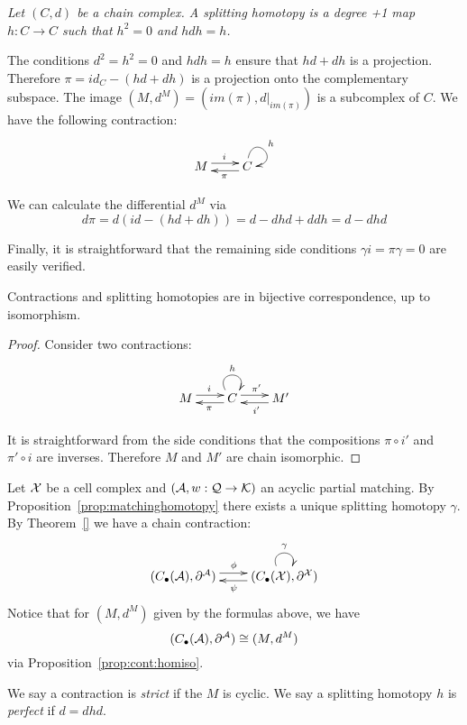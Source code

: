 \begin{defn}
{\em
Let $(C,d)$ be a chain complex.  A {\em splitting homotopy} is a degree +1 map $h:C\to C$ such that $h^2=0$ and $h dh = h$.
}
\end{defn}

The conditions $d^2=h^2=0$ and $hdh = h$ ensure that $hd+dh$ is a projection.  Therefore $\pi=id_C-(hd+dh)$ is a projection onto the complementary subspace.  The image $(M,d^M)=(im(\pi),d|_{im(\pi)})$ is a subcomplex of $C$.  We have the following contraction:
\[
\xymatrixrowsep{0.03in}
\xymatrixcolsep{0.3in}
\xymatrix{
M  \ar[r]<3pt>^{i} & \ar[l]<3pt>^{\pi} C \ar@(u,r)^{h}
}
\]

We can calculate the differential $d^M$ via $$d\pi = d(id-(hd+dh)) = d-dhd + ddh = d-dhd$$

Finally, it is straightforward that the remaining side conditions $\gamma i=\pi\gamma = 0$ are easily verified. 

\begin{prop}\label{prop:cont:homiso}
Contractions and splitting homotopies are in bijective correspondence, up to isomorphism.
\end{prop}
\begin{proof}
Consider two contractions:
\[
\xymatrixrowsep{0.03in}
\xymatrixcolsep{0.3in}
\xymatrix{
M  \ar[r]<3pt>^{i} & \ar[l]<3pt>^{\pi} C \ar@(ul,ur)^{h} \ar[r]<3pt>^{\pi'}  & M'  \ar[l]<3pt>^{i'}
}
\] 

It is straightforward from the side conditions that the compositions $\pi\circ i'$ and $\pi'\circ i$ are inverses.  Therefore $M$ and $M'$ are chain isomorphic.
\end{proof}

\begin{ex}
Let ${\mathcal X}$ be a cell complex and $({\mathcal A},w:{\mathcal Q}\to {\mathcal K})$ an acyclic partial matching.  By Proposition~\ref{prop:matchinghomotopy} there exists a unique splitting homotopy $\gamma$.  By Theorem~\ref{} we have a chain contraction:
\[
\xymatrixrowsep{0.03in}
\xymatrixcolsep{0.3in}
\xymatrix{
(C_\bullet(\cA),\partial^\cA)  \ar[r]<3pt>^{\phi} & \ar[l]<3pt>^{\psi} (C_\bullet(\cX),\partial^\cX) \ar@(ul,ur)^{\gamma}
}
\]
Notice that for $(M,d^M)$ given by the formulas above, we have
\[
(C_\bullet({\mathcal A}),\partial^{\mathcal A}) \cong (M,d^M)
\]
via Proposition~\ref{prop:cont:homiso}.
\end{ex}


  We say a contraction is {\em strict} if the $M$ is cyclic.  We say a splitting homotopy $h$ is {\em perfect} if $d=dhd$. 

